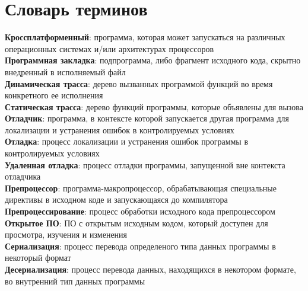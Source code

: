 \chapter*{Словарь терминов}             %

\textbf{Кроссплатформенный}: программа, которая может запускаться на различных операционных системах и/или архитектурах процессоров           \\
\textbf{Программная закладка}: подпрограмма, либо фрагмент исходного кода, скрытно внедренный в исполняемый файл                              \\
\textbf{Динамическая трасса}: дерево вызванных программой функций во время конкретного ее исполнения                                          \\
\textbf{Статическая трасса}: дерево функций программы, которые объявлены для вызова                                                           \\
\textbf{Отладчик}: программа, в контексте которой запускается другая программа для локализации и устранения ошибок
в контролируемых условиях                                                                                                                     \\
\textbf{Отладка}: процесс локализации и устранения ошибок программы в контролируемых условиях                                                 \\
\textbf{Удаленная отладка}: процесс отладки программы, запущенной вне контекста отладчика                                                     \\
\textbf{Препроцессор}: программа-макропроцессор, обрабатывающая специальные директивы в исходном коде и запускающаяся до компилятора          \\
\textbf{Препроцессирование}: процесс обработки исходного кода препроцессором                                                                  \\
\textbf{Открытое ПО}: ПО с открытым исходным кодом, который доступен для просмотра, изучения и изменения                                      \\
\textbf{Сериализация}: процесс перевода определеного типа данных программы в некоторый формат                                                 \\
\textbf{Десериализация}: процесс перевода данных, находящихся в некотором формате, во внутренний тип данных программы                         \\

